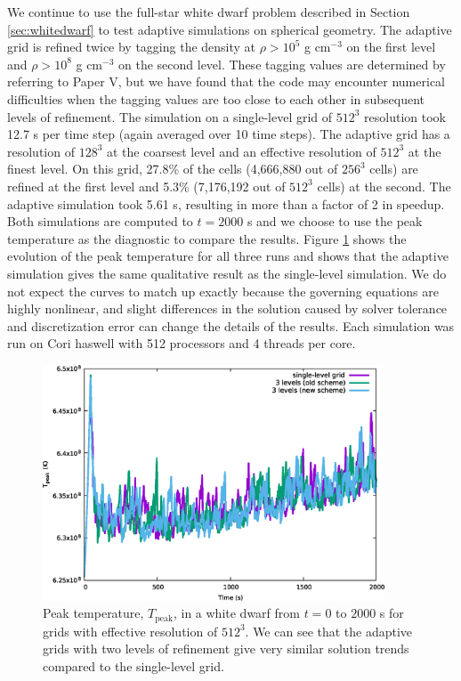 We continue to use the full-star white dwarf problem described in Section \ref{sec:whitedwarf} to test adaptive simulations on spherical geometry. The adaptive grid is refined twice by tagging the density at $\rho > 10^5$ g cm$^{-3}$ on the first level and $\rho > 10^8$ g cm$^{-3}$ on the second level. These tagging values are determined by referring to Paper V, but we have found that the code may encounter numerical difficulties when the tagging values are too close to each other in subsequent levels of refinement.
The simulation on a single-level grid of $512^3$ resolution took 12.7 s per time step (again averaged over 10 time steps).  The adaptive grid has a resolution of $128^3$ at the coarsest level and an effective resolution of $512^3$ at the finest level. On this grid, 27.8\% of the cells (4,666,880 out of $256^3$ cells) are refined at the first level and 5.3\% (7,176,192 out of $512^3$ cells) at the second. The adaptive simulation took 5.61 s, resulting in more than a factor of 2 in speedup. Both simulations are computed to $t=2000$ s and we choose to use the peak temperature as the diagnostic to compare the results. Figure \ref{fig:wdconvect_amr_Tmax} shows the evolution of the peak temperature for all three runs and shows that the adaptive simulation gives the same qualitative result as the single-level simulation. We do not expect the curves to match up exactly because the governing equations are highly nonlinear, and slight differences in the solution caused by solver tolerance and discretization error can change the details of the results. Each simulation was run on Cori haswell with 512 processors and 4 threads per core.

\begin{figure}[htb]
\begin{center}
\includegraphics[width=4.0in]{./figs/wdconvect_amr_Tmax}
\caption{\label{fig:wdconvect_amr_Tmax} Peak temperature, $T_{\text{peak}}$, in a white dwarf from $t=0$ to $2000$ s
         for grids with effective resolution of $512^3$. We can see that the adaptive grids with two levels of
         refinement give very similar solution trends compared to the single-level grid.}
\end{center}
\end{figure}
